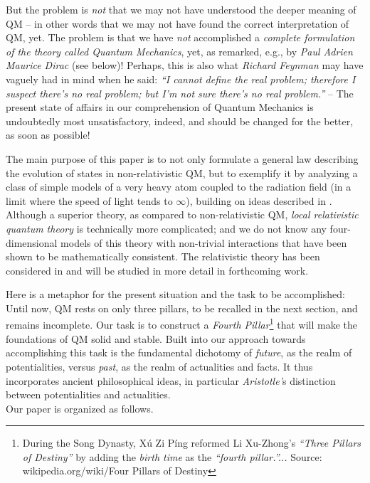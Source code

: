 \documentclass[a4paper,11pt]{article}
\begin{document}
But the problem is \textit{not} that we may not have understood the deeper meaning of QM -- in other words that we may not 
have found the correct interpretation of QM, yet. The problem is that we have \textit{not} accomplished a \textit{complete 
formulation of the theory called Quantum Mechanics}, yet, as remarked, e.g., by \textit{Paul Adrien Maurice  Dirac} (see 
below)!  Perhaps, this is also what \textit{Richard Feynman} may have vaguely had in mind when he said: 
\textit{``I cannot define the real problem; therefore I suspect there's no real problem; but I'm not sure there's no real problem.''} 
-- The present state of affairs in our comprehension of Quantum Mechanics is undoubtedly most unsatisfactory, 
indeed, and should be changed for the better, as soon as possible! 

The main purpose of this paper is to not only formulate a general law describing the evolution of states in non-relativistic QM, 
but to exemplify it by analyzing a class of simple models of a very heavy atom coupled to the radiation field (in a limit where 
the speed of light tends to $\infty$), building on ideas described in \cite{F-Schub, BFS, Fr1, LMU-19}.  Although a superior theory, 
as compared to non-relativistic QM, \textit{local relativistic quantum theory} is  technically more complicated; and we do  
not  know any four-dimensional models of this theory with non-trivial interactions that have been shown to be mathematically 
consistent. The relativistic theory has been considered in \cite{Fr2} and will be studied in more detail in forthcoming work.

Here is a metaphor for the present situation and the task to be accomplished: Until now, QM rests on  only 
three pillars, to be recalled in the next section, and remains incomplete. Our task is to construct a \textit{Fourth Pillar}\footnote{During the Song Dynasty, X\'u Zi Píng reformed Li Xu-Zhong's \textit{``Three Pillars of Destiny''} by adding the \textit{birth time} as the \textit{``fourth pillar.''...} Source: wikipedia.org/wiki/Four Pillars of Destiny} that will 
make the foundations of QM solid and stable. Built into our approach towards accomplishing this task is the fundamental 
dichotomy of \textit{future}, as the realm of potentialities, versus \textit{past}, as the realm of actualities 
and facts. It thus incorporates ancient philosophical ideas, in particular \textit{Aristotle'}s distinction 
between potentialities and actualities.\\

Our paper is organized as follows.
\end{document}
